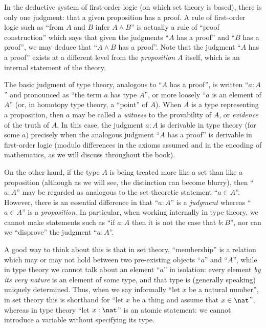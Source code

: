 {In the deductive system of first-order logic (on which set theory is based), there is only one judgment: that a given proposition has a proof.
A rule of first-order logic such as ``from $A$ and $B$ infer $A\wedge B$'' is actually a rule of ``proof construction'' which says that given the judgments ``$A$ has a proof'' and ``$B$ has a proof'', we may deduce that ``$A\wedge B$ has a proof''.
Note that the judgment ``$A$ has a proof'' exists at a different level from the \emph{proposition} $A$ itself, which is an internal statement of the theory.

The basic judgment of type theory, analogous to ``$A$ has a proof'', is written ``$a:A$'' and pronounced as ``the term $a$ has type $A$'', or more loosely ``$a$ is an element of $A$'' (or, in homotopy type theory, a ``point'' of $A$).
When $A$ is a type representing a proposition, then $a$ may be called a \emph{witness} to the provability of $A$, or \emph{evidence} of the truth of $A$.
In this case, the judgment $a:A$ is derivable in type theory (for some $a$) precisely when the analogous judgment ``$A$ has a proof'' is derivable in first-order logic (modulo differences in the axioms assumed and in the encoding of mathematics, as we will discuss throughout the book).

On the other hand, if the type $A$ is being treated more like a set than like a proposition (although as we will see, the distinction can become blurry), then ``$a:A$'' may be regarded as analogous to the set-theoretic statement ``$a\in A$''.
However, there is an essential difference in that ``$a:A$'' is a \emph{judgment} whereas ``$a\in A$'' is a \emph{proposition}.
In particular, when working internally in type theory, we cannot make statements such as ``if $a:A$ then it is not the case that $b:B$'', nor can we ``disprove'' the judgment ``$a:A$''.

A good way to think about this is that in set theory, ``membership'' is a relation which may or may not hold between two pre-existing objects ``$a$'' and ``$A$'', while in type theory we cannot talk about an element ``$a$'' in isolation: every element \emph{by its very nature} is an element of some type, and that type is (generally speaking) uniquely determined.
Thus, when we say informally ``let $x$ be a natural number'', in set theory this is shorthand for ``let $x$ be a thing and assume that $x\in\nat$'', whereas in type theory ``let $x:\nat$'' is an atomic statement: we cannot introduce a variable without specifying its type.

}
